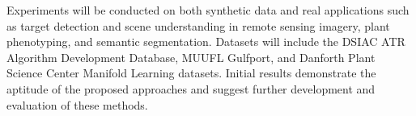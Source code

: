 Experiments will be conducted on both synthetic data and real applications such as target detection and scene understanding in remote sensing imagery, plant phenotyping, and semantic segmentation.  Datasets will include the DSIAC ATR Algorithm Development Database, MUUFL Gulfport, and Danforth Plant Science Center Manifold Learning datasets.  Initial results demonstrate the aptitude of the proposed approaches and suggest further development and evaluation of these methods.



